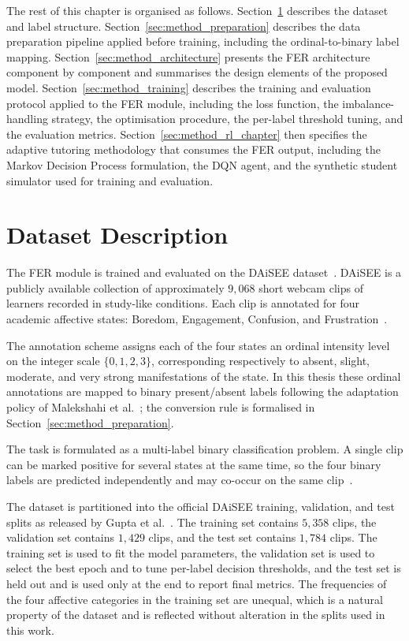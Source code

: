 The rest of this chapter is organised as follows. Section~\ref{sec:method_dataset} describes the dataset and label structure. Section~\ref{sec:method_preparation} describes the data preparation pipeline applied before training, including the ordinal-to-binary label mapping. Section~\ref{sec:method_architecture} presents the \ac{FER} architecture component by component and summarises the design elements of the proposed model. Section~\ref{sec:method_training} describes the training and evaluation protocol applied to the \ac{FER} module, including the loss function, the imbalance-handling strategy, the optimisation procedure, the per-label threshold tuning, and the evaluation metrics. Section~\ref{sec:method_rl_chapter} then specifies the adaptive tutoring methodology that consumes the \ac{FER} output, including the Markov Decision Process formulation, the \ac{DQN} agent, and the synthetic student simulator used for training and evaluation.

\section{Dataset Description}\label{sec:method_dataset}

The \ac{FER} module is trained and evaluated on the \ac{DAiSEE} dataset~\cite{gupta_daisee_2016}. \ac{DAiSEE} is a publicly available collection of approximately $9{,}068$ short webcam clips of learners recorded in study-like conditions. Each clip is annotated for four academic affective states: Boredom, Engagement, Confusion, and Frustration~\cite{gupta_daisee_2016}.

The annotation scheme assigns each of the four states an ordinal intensity level on the integer scale $\{0,1,2,3\}$, corresponding respectively to absent, slight, moderate, and very strong manifestations of the state. In this thesis these ordinal annotations are mapped to binary present/absent labels following the adaptation policy of Malekshahi et al.~\cite{malekshahi_engagement_2024}; the conversion rule is formalised in Section~\ref{sec:method_preparation}.

The task is formulated as a multi-label binary classification problem. A single clip can be marked positive for several states at the same time, so the four binary labels are predicted independently and may co-occur on the same clip~\cite{gupta_daisee_2016}.

The dataset is partitioned into the official \ac{DAiSEE} training, validation, and test splits as released by Gupta et al.~\cite{gupta_daisee_2016}. The training set contains $5{,}358$ clips, the validation set contains $1{,}429$ clips, and the test set contains $1{,}784$ clips. The training set is used to fit the model parameters, the validation set is used to select the best epoch and to tune per-label decision thresholds, and the test set is held out and is used only at the end to report final metrics. The frequencies of the four affective categories in the training set are unequal, which is a natural property of the dataset and is reflected without alteration in the splits used in this work.

